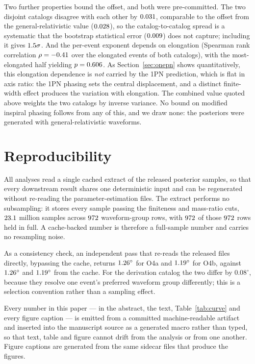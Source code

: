 \documentclass[aps,preprint,amsmath,amssymb,nofootinbib,superscriptaddress]{revtex4-2}
\begin{document}
Two further properties bound the offset, and both were pre-committed. The two disjoint catalogs disagree
with each other by $0.031$, comparable to the offset from the general-relativistic value
($0.028$), so the catalog-to-catalog spread is a systematic that the bootstrap statistical error
($0.009$) does not capture; including it gives $1.5\sigma$. And the per-event exponent
depends on elongation (Spearman rank correlation $\rho = -0.41$ over the elongated events of both
catalogs), with the most-elongated half yielding $p=0.606$. As Section~\ref{sec:onepn} shows
quantitatively, this elongation dependence is \emph{not} carried by the 1PN prediction, which is flat in
axis ratio: the 1PN phasing sets the central displacement, and a distinct finite-width effect produces the
variation with elongation. The combined value quoted above weights the two catalogs by inverse variance.
No bound on modified inspiral phasing follows from any of this, and we draw none: the posteriors were
generated with general-relativistic waveforms.

\section{Reproducibility}
\label{app:repro}
All analyses read a single cached extract of the released posterior samples, so that every downstream
result shares one deterministic input and can be regenerated without re-reading the parameter-estimation
files. The extract performs no subsampling: it stores every sample passing the finiteness and mass-ratio
cuts, $23.1$ million samples across $972$ waveform-group rows, with $972$ of
those $972$ rows held in full. A cache-backed number is therefore a full-sample number and carries
no resampling noise.

As a consistency check, an independent pass that re-reads the released files directly, bypassing the cache,
returns $1.26^\circ$ for O4a and $1.19^\circ$ for O4b, against $1.26^\circ$ and
$1.19^\circ$ from the cache. For the derivation catalog the two differ by $0.08^\circ$, because
they resolve one event's preferred waveform group differently; this is a selection convention rather than
a sampling effect.

Every number in this paper --- in the abstract, the text, Table~\ref{tab:curve} and every figure caption
--- is emitted from a committed machine-readable artifact and inserted into the manuscript source as a
generated macro rather than typed, so that text, table and figure cannot drift from the analysis or from
one another. Figure captions are generated from the same sidecar files that produce the figures.
\end{document}
